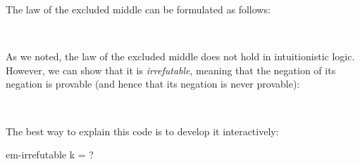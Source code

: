 The law of the excluded middle can be formulated as follows:

\begin{fence}
\begin{code}%
\>[0]\<%
\\
\>[0][@{}l@{\AgdaIndent{0}}]%
\>[2]\AgdaSpace{}%
\AgdaSymbol{:}\AgdaSpace{}%
\AgdaSpace{}%
\AgdaSymbol{\{}\AgdaSpace{}%
\AgdaSymbol{:}\AgdaSpace{}%
\AgdaSymbol{\}}\AgdaSpace{}%
\AgdaSpace{}%
\AgdaSpace{}%
\AgdaSpace{}%
\AgdaSpace{}%
\<%
\end{code}
\end{fence}

As we noted, the law of the excluded middle does not hold in
intuitionistic logic. However, we can show that it is
\emph{irrefutable}, meaning that the negation of its negation is
provable (and hence that its negation is never provable):

\begin{fence}
\begin{code}%
\>[0]\AgdaSpace{}%
\AgdaSymbol{:}\AgdaSpace{}%
\AgdaSpace{}%
\AgdaSymbol{\{}\AgdaSpace{}%
\AgdaSymbol{:}\AgdaSpace{}%
\AgdaSymbol{\}}\AgdaSpace{}%
\AgdaSpace{}%
\AgdaSpace{}%
\AgdaSpace{}%
\AgdaSymbol{(}\AgdaSpace{}%
\AgdaSpace{}%
\AgdaSpace{}%
\AgdaSymbol{)}\<%
\\
\>[0]\AgdaSpace{}%
\AgdaSymbol{=}\AgdaSpace{}%
\AgdaSpace{}%
\AgdaSpace{}%
\AgdaSpace{}%
\AgdaSpace{}%
\AgdaSymbol{(}\AgdaSpace{}%
\AgdaSpace{}%
\AgdaSpace{}%
\AgdaSpace{}%
\AgdaSpace{}%
\AgdaSymbol{(}\AgdaSpace{}%
\AgdaSymbol{)))}\<%
\end{code}
\end{fence}

The best way to explain this code is to develop it interactively:

\begin{myDisplay}
em-irrefutable k = ?
\end{myDisplay}

